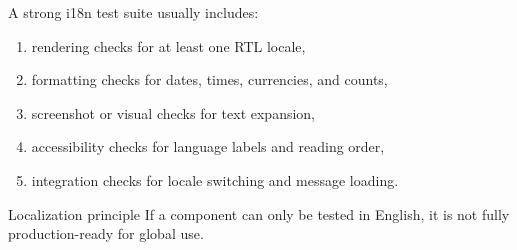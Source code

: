 A strong i18n test suite usually includes:

\begin{enumerate}[leftmargin=*, itemsep=0.35em]
  \item rendering checks for at least one RTL locale,
  \item formatting checks for dates, times, currencies, and counts,
  \item screenshot or visual checks for text expansion,
  \item accessibility checks for language labels and reading order,
  \item integration checks for locale switching and message loading.
\end{enumerate}

\begin{highlightbox}{Localization principle}
If a component can only be tested in English, it is not fully production-ready for global use.
\end{highlightbox}
